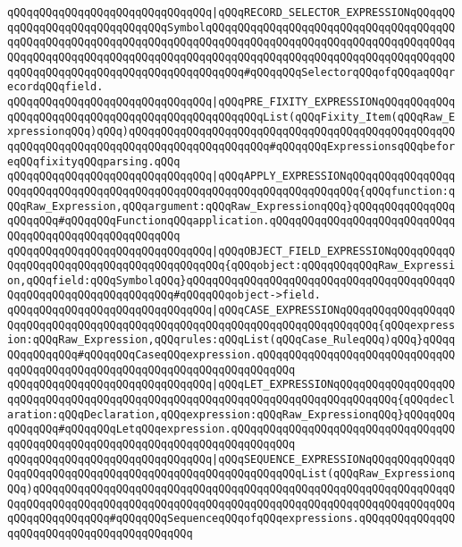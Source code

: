 \verb|qQQqqQQqqQQqqQQqqQQqqQQqqQQqqQQq|\verb#|qQQqRECORD_SELECTOR_EXPRESSIONqQQqqQQqqQQqqQQqqQQqqQQqqQQqqQQqSymbolqQQqqQQqqQQqqQQqqQQqqQQqqQQqqQQqqQQqqQQqqQQqqQQqqQQqqQQqqQQqqQQqqQQqqQQqqQQqqQQqqQQqqQQqqQQqqQQqqQQqqQQqqQQqqQQqqQQqqQQqqQQqqQQqqQQqqQQqqQQqqQQqqQQqqQQqqQQqqQQqqQQqqQQqqQQqqQQqqQQqqQQqqQQqqQQqqQQqqQQqqQQqqQQqqQQqqQQq#\verb|#qQQqqQQqSelectorqQQqofqQQqaqQQqrecordqQQqfield.|\newline
\verb|qQQqqQQqqQQqqQQqqQQqqQQqqQQqqQQq|\verb#|qQQqPRE_FIXITY_EXPRESSIONqQQqqQQqqQQqqQQqqQQqqQQqqQQqqQQqqQQqqQQqqQQqqQQqqQQqList(qQQqFixity_Item(qQQqRaw_ExpressionqQQq)qQQq)qQQqqQQqqQQqqQQqqQQqqQQqqQQqqQQqqQQqqQQqqQQqqQQqqQQqqQQqqQQqqQQqqQQqqQQqqQQqqQQqqQQqqQQqqQQq#\verb|#qQQqqQQqExpressionsqQQqbeforeqQQqfixityqQQqparsing.qQQq|\newline
\verb|qQQqqQQqqQQqqQQqqQQqqQQqqQQqqQQq|\verb#|qQQqAPPLY_EXPRESSIONqQQqqQQqqQQqqQQqqQQqqQQqqQQqqQQqqQQqqQQqqQQqqQQqqQQqqQQqqQQqqQQqqQQqqQQq{qQQqfunction:qQQqRaw_Expression,qQQqargument:qQQqRaw_ExpressionqQQq}qQQqqQQqqQQqqQQqqQQqqQQq#\verb|#qQQqqQQqFunctionqQQqapplication.qQQqqQQqqQQqqQQqqQQqqQQqqQQqqQQqqQQqqQQqqQQqqQQqqQQqqQQq|\newline
\verb|qQQqqQQqqQQqqQQqqQQqqQQqqQQqqQQq|\verb#|qQQqOBJECT_FIELD_EXPRESSIONqQQqqQQqqQQqqQQqqQQqqQQqqQQqqQQqqQQqqQQqqQQq{qQQqobject:qQQqqQQqqQQqRaw_Expression,qQQqfield:qQQqSymbolqQQq}qQQqqQQqqQQqqQQqqQQqqQQqqQQqqQQqqQQqqQQqqQQqqQQqqQQqqQQqqQQqqQQqqQQq#\verb|#qQQqqQQqobject->field.|\newline
\verb|qQQqqQQqqQQqqQQqqQQqqQQqqQQqqQQq|\verb#|qQQqCASE_EXPRESSIONqQQqqQQqqQQqqQQqqQQqqQQqqQQqqQQqqQQqqQQqqQQqqQQqqQQqqQQqqQQqqQQqqQQqqQQqqQQq{qQQqexpression:qQQqRaw_Expression,qQQqrules:qQQqList(qQQqCase_RuleqQQq)qQQq}qQQqqQQqqQQqqQQq#\verb|#qQQqqQQqCaseqQQqexpression.qQQqqQQqqQQqqQQqqQQqqQQqqQQqqQQqqQQqqQQqqQQqqQQqqQQqqQQqqQQqqQQqqQQqqQQqqQQq|\newline
\verb|qQQqqQQqqQQqqQQqqQQqqQQqqQQqqQQq|\verb#|qQQqLET_EXPRESSIONqQQqqQQqqQQqqQQqqQQqqQQqqQQqqQQqqQQqqQQqqQQqqQQqqQQqqQQqqQQqqQQqqQQqqQQqqQQqqQQq{qQQqdeclaration:qQQqDeclaration,qQQqexpression:qQQqRaw_ExpressionqQQq}qQQqqQQqqQQqqQQq#\verb|#qQQqqQQqLetqQQqexpression.qQQqqQQqqQQqqQQqqQQqqQQqqQQqqQQqqQQqqQQqqQQqqQQqqQQqqQQqqQQqqQQqqQQqqQQqqQQqqQQq|\newline
\verb|qQQqqQQqqQQqqQQqqQQqqQQqqQQqqQQq|\verb#|qQQqSEQUENCE_EXPRESSIONqQQqqQQqqQQqqQQqqQQqqQQqqQQqqQQqqQQqqQQqqQQqqQQqqQQqqQQqqQQqList(qQQqRaw_ExpressionqQQq)qQQqqQQqqQQqqQQqqQQqqQQqqQQqqQQqqQQqqQQqqQQqqQQqqQQqqQQqqQQqqQQqqQQqqQQqqQQqqQQqqQQqqQQqqQQqqQQqqQQqqQQqqQQqqQQqqQQqqQQqqQQqqQQqqQQqqQQqqQQqqQQqqQQqqQQq#\verb|#qQQqqQQqSequenceqQQqofqQQqexpressions.qQQqqQQqqQQqqQQqqQQqqQQqqQQqqQQqqQQqqQQqqQQq|\newline
